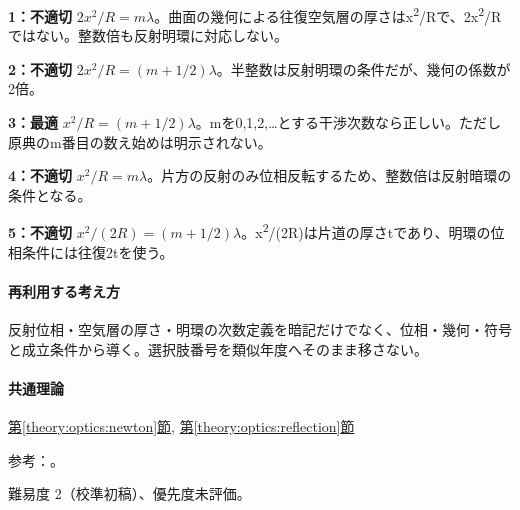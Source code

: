 \noindent\textbf{1：不適切} \(2x^2/R=m\lambda\)。曲面の幾何による往復空気層の厚さはx\textsuperscript{2}/Rで、2x\textsuperscript{2}/Rではない。整数倍も反射明環に対応しない。\par

\noindent\textbf{2：不適切} \(2x^2/R=(m+1/2)\lambda\)。半整数は反射明環の条件だが、幾何の係数が2倍。\par

\noindent\textbf{3：最適} \(x^2/R=(m+1/2)\lambda\)。mを0,1,2,…とする干渉次数なら正しい。ただし原典のm番目の数え始めは明示されない。\par

\noindent\textbf{4：不適切} \(x^2/R=m\lambda\)。片方の反射のみ位相反転するため、整数倍は反射暗環の条件となる。\par

\noindent\textbf{5：不適切} \(x^2/(2R)=(m+1/2)\lambda\)。x\textsuperscript{2}/(2R)は片道の厚さtであり、明環の位相条件には往復2tを使う。\par

\paragraph{再利用する考え方} 反射位相・空気層の厚さ・明環の次数定義を暗記だけでなく、位相・幾何・符号と成立条件から導く。選択肢番号を類似年度へそのまま移さない。

\paragraph{共通理論} \hyperref[theory:optics:newton]{第\ref*{theory:optics:newton}節}, \hyperref[theory:optics:reflection]{第\ref*{theory:optics:reflection}節}

\par 参考：\cite{os_thinfilm}。

\par 難易度 2（校準初稿）、優先度未評価。
